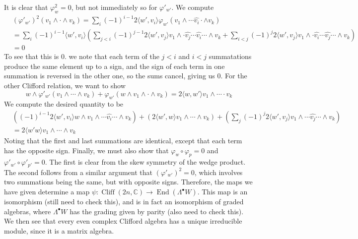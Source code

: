 \documentclass[psamsfonts]{amsart}
\theoremstyle{definition}
\theoremstyle{remark}
\newcommand{\C}{\mathbb{C}}
\DeclareMathOperator{\End}{End}
\DeclareMathOperator{\Cliff}{Cliff}
\begin{document}
It is clear that $\varphi_w^2 = 0$, but not immediately so for $\varphi'_{w'}$. We compute
%
\begin{align*}
&(\varphi'_{w'})^2(v_1 \wedge \cdot \wedge v_k) = \sum_i (-1)^{i-1} 2\langle w', v_i \rangle \varphi_{w'}(v_1 \wedge \cdots \hat{v_i} \cdot \wedge v_k) \\
&= \sum_i (-1)^{i-1} \langle w', v_i \rangle \left( \sum_{j < i} (-1)^{j-1} 2\langle w', v_j \rangle v_1 \wedge \cdot \hat{v_j} \cdots \hat{v_i} \cdots \wedge v_k + \sum_{i < j} (-1)^{j} 2\langle w', v_j \rangle v_1 \wedge \cdot \hat{v_i} \cdots \hat{v_j} \cdots \wedge v_k  \right) \\
&= 0
\end{align*}
To see that this is $0$. we note that each term of the $j < i$ and $i < j$ summatations produce the same element up to a sign, and the sign of each term in one summation is reversed in the other one, so the sums cancel, giving us $0$. For the other Clifford relation, we want to show 
\[
w \wedge \varphi'_{w'}(v_1 \wedge \cdots \wedge v_k) + \varphi_{w'}(w \wedge v_1 \wedge \cdot \wedge v_k) = 2\langle w, w' \rangle v_1 \wedge \cdots \cdot v_k
\]
We compute the desired quantity to be
\begin{align*}
&\left( (-1)^{i-1} 2\langle w', v_i \rangle w \wedge v_1 \wedge \cdots \hat{v_i} \cdots \wedge v_k \right) + \left( 2\langle w', w \rangle v_1 \wedge \cdots \wedge v_k \right) + \left( \sum_j (-1)^j 2\langle w', v_j \rangle v_1 \wedge \cdots \hat{v_j} \cdots \wedge v_k  \right) \\
&= 2\langle w' w \rangle v_1 \wedge \cdots \wedge v_k
\end{align*}
Noting that the first and last summations are identical, except that each term has the opposite sign. Finally, we must also show that $\varphi_w \circ \varphi_p = 0$ and $\varphi'_{w'} \circ \varphi'_{p'} = 0$. The first is clear from the skew symmetry of the wedge product. The second follows from a similar argument that $(\varphi'_{w'})^2 = 0$, which involves two summations being the same, but with opposite signs. Therefore, the maps we have given determine a map $\psi : \Cliff(2n, \C) \to \End(\Lambda^\bullet W)$. This map is an isomorphism (still need to check this), and is in fact an isomorphism of graded algebras, where $\Lambda^\bullet W$ has the grading given by parity (also need to check this). We then see that every even complex Clifford algebra has a unique irreducible module, since it is a matrix algebra.
%
\end{document}

